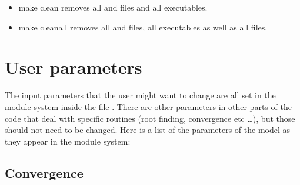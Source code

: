 \documentclass[letterpaper,10pt,english]{sphinxmanual}
\begin{document}
\begin{itemize}
\begin{sphinxVerbatim}[commandchars=\\\{\}]
    make clean make parspace mpirun \PYGZhy{}n NUMBER\PYGZus{}OF\PYGZus{}PROCESSES ./XNS\PYGZhy{}mpi
\end{sphinxVerbatim}

\sphinxAtStartPar
Note that it must be NUMBER\_OF\_PROCESSES\(\geq\)2, because one process is always only passing initial conditions to the other processes, and NUMBER\_OF\_PROCESSES\sphinxhyphen{}1\(\leq\)(NOMG+1)\(\times\)(NRHO1+1)\(\times\)(NKB+1), that is the number of computing processes must not be larger than the number of models to be computed.


\item {} 
\sphinxAtStartPar
make clean \sphinxhyphen{} removes all  and  files and all executables.


\item {} 
\sphinxAtStartPar
make cleanall \sphinxhyphen{} removes all  and  files, all executables as well as all  files.

\end{itemize}


\chapter{User parameters}
\label{\detokenize{user_params:user-parameters}}\label{\detokenize{user_params::doc}}
\sphinxAtStartPar
The input parameters that the user might want to change are all set in the module system inside the file . There are other parameters in other parts of the code that deal with specific routines (root finding, convergence etc …), but those should not need to be changed. Here is a list of the parameters of the model as they appear in the module system:


\section{Convergence}
\label{\detokenize{user_params:convergence}}
\end{document}
